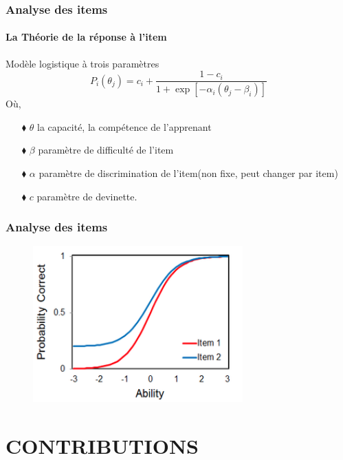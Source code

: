 \documentclass[aspectratio=169,professionalfonts, 12pt]{beamer}
\begin{document}
\begin{frame}
  \frametitle{Analyse des items}
  \framesubtitle{La Théorie de la réponse à l'item}
  \justifying
  \begin{minipage}{\textwidth}
  \begin{block}{Modèle logistique à trois paramètres}
    \begin{equation}
      P_{i}(\theta_{j}) = c_{i} +  \frac{1 - c_{i}}{1+ \exp \left[ -\alpha_{i}(\theta_{j}-\beta_{i}) \right]  } 
    \end{equation}
    Où, \\
    \begin{itemize}
      \item[$\blacklozenge$] \(\displaystyle \theta \) la capacité, la compétence de l'apprenant 
      \item[$\blacklozenge$] \(\displaystyle \beta \) paramètre de difficulté de l'item
      \item[$\blacklozenge$] \(\displaystyle \alpha \) paramètre de discrimination de l'item(non fixe, peut changer par item)
      \item[$\blacklozenge$] \(\displaystyle c \) paramètre de devinette.
    \end{itemize}
  \end{block}  
  \end{minipage} 
\end{frame}

\begin{frame}
  \frametitle{Analyse des items}
  \justifying 
  \begin{minipage}{\textwidth}
  \begin{figure}[H]
      \includegraphics[height=6cm]{images/etat_art/IRT3.png}
  \end{figure}
  \end{minipage}
\end{frame}

\section{CONTRIBUTIONS}
\end{document}

